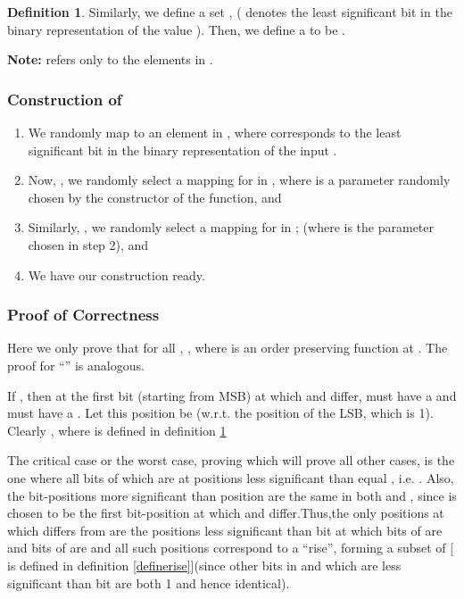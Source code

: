 \documentclass[11pt, letterpaper, romanappendices, onecolumn]{article}
\theoremstyle{plain}\newtheorem{thm}{Theorem}[section]
\theoremstyle{definition}
\newtheorem{defn}{Definition}[section]
\theoremstyle{remark}
\begin{document}
\begin{defn}\label{definefall}
Similarly, we define a set , ( denotes the  least significant bit in the binary representation of the value  ). Then, we define a  to be .
\end{defn}

\par \textbf{Note:}  refers only to the elements in .

\subsubsection{Construction of }\label{ConsC}
\begin{enumerate}
	\item We randomly map  to an element in , where  corresponds to the  least significant bit in the binary representation of the input .
	\item Now, , we randomly select a mapping for  in , where  is a parameter randomly chosen by the constructor of the function, and
	
	\item Similarly, , we randomly select a mapping for  in ; (where  is the parameter chosen in step 2), and
	
	\item We have our construction ready.
	
\end{enumerate}

\subsubsection{Proof of Correctness}
\par Here we only prove that for all , , where  is an order preserving function at . The proof for ``'' is analogous.

\par If , then at the first bit (starting from MSB) at which  and  differ,  must have a  and  must have a . Let this position be  (w.r.t. the position of the LSB, which is 1). Clearly , where  is defined in definition \ref{definefall} 

\par The critical case or the worst case, proving which will prove all other cases, is the one where all bits of  which are at positions less significant than  equal , i.e. . Also, the bit-positions more significant than position  are the same in both  and , since  is chosen to be the first bit-position at which  and  differ.Thus,the only positions at which  differs from  are the positions less significant than  bit at which bits of  are  and bits of  are  and all such positions correspond to a ``rise'', forming a subset of  [ is defined in definition \ref{definerise}](since other bits in  and  which are less significant than  bit are both 1 and hence identical).
\end{document}
